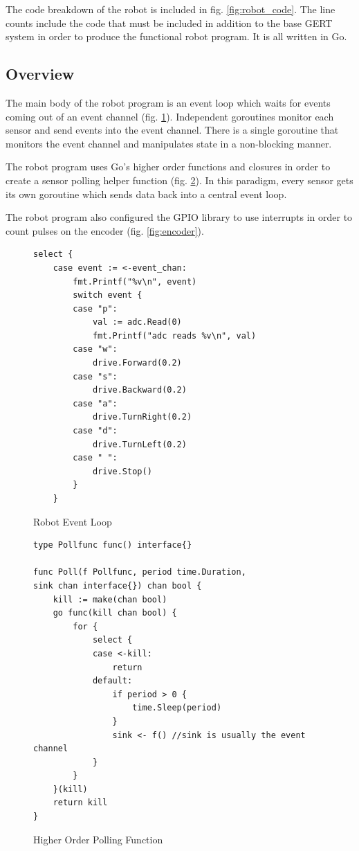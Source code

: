 The code breakdown of the robot is included in fig. \ref{fig:robot_code}. The line counts include the code that must be
included in addition to the base GERT system in order to produce the functional robot program. It is all written
in Go.

\subsection{Overview}
The main body of the robot program is an event loop which waits for events coming out of an event channel (fig. \ref{fig:event_loop}).
Independent goroutines monitor each sensor and send events into the event channel. There is a
single goroutine that monitors the event channel and manipulates state in a non-blocking manner.

The robot program uses Go's higher order functions and closures in order to create a sensor polling helper function
(fig. \ref{fig:poll_func}). In this paradigm, every sensor gets its own goroutine which sends
data back into a central event loop.

The robot program also configured the GPIO library to use interrupts in order to count pulses on the encoder (fig. \ref{fig:encoder}).

\begin{figure}[!h]
  \begin{center}
\begin{lstlisting}
select {
	case event := <-event_chan:
		fmt.Printf("%v\n", event)
		switch event {
		case "p":
			val := adc.Read(0)
			fmt.Printf("adc reads %v\n", val)
		case "w":
			drive.Forward(0.2)
		case "s":
			drive.Backward(0.2)
		case "a":
			drive.TurnRight(0.2)
		case "d":
			drive.TurnLeft(0.2)
		case " ":
			drive.Stop()
		}
	}
\end{lstlisting}
\end{center}
  \caption{Robot Event Loop} \label{fig:event_loop}
\end{figure}


\begin{figure}[!h]
\begin{center}
\begin{lstlisting}
type Pollfunc func() interface{}

func Poll(f Pollfunc, period time.Duration,
sink chan interface{}) chan bool {
	kill := make(chan bool)
	go func(kill chan bool) {
		for {
			select {
			case <-kill:
				return
			default:
				if period > 0 {
					time.Sleep(period)
				}
				sink <- f() //sink is usually the event channel
			}
		}
	}(kill)
	return kill
}
\end{lstlisting}
\end{center}
  \caption{Higher Order Polling Function} \label{fig:poll_func}
\end{figure}


